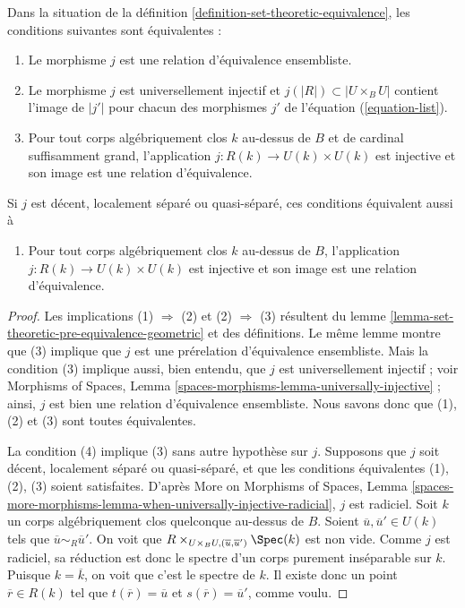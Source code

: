 \begin{lemma}
\label{lemma-set-theoretic-equivalence-geometric}
Dans la situation de la définition \ref{definition-set-theoretic-equivalence},
les conditions suivantes sont équivalentes :
\begin{enumerate}
\item Le morphisme $j$ est une relation d'équivalence ensembliste.
\item Le morphisme $j$ est universellement injectif et
$j(|R|) \subset |U \times_B U|$ contient l'image de
$|j'|$ pour chacun des morphismes $j'$ de l'équation (\ref{equation-list}).
\item Pour tout corps algébriquement clos $k$ au-dessus de $B$ et de cardinal suffisamment grand,
l'application $j : R(k) \to U(k) \times U(k)$ est injective et
son image est une relation d'équivalence.
\end{enumerate}
Si $j$ est décent, localement séparé ou quasi-séparé,
ces conditions équivalent aussi à
\begin{enumerate}
\item[(4)] Pour tout corps algébriquement clos $k$ au-dessus de $B$,
l'application $j : R(k) \to U(k) \times U(k)$ est injective et son image
est une relation d'équivalence.
\end{enumerate}
\end{lemma}

\begin{proof}
Les implications (1) $\Rightarrow$ (2) et (2) $\Rightarrow$ (3) résultent du
lemme \ref{lemma-set-theoretic-pre-equivalence-geometric}
et des définitions. Le même lemme montre que (3) implique que
$j$ est une prérelation d'équivalence ensembliste. Mais la condition
(3) implique aussi, bien entendu, que $j$ est universellement injectif ; voir
Morphisms of Spaces, Lemma \ref{spaces-morphisms-lemma-universally-injective} ;
ainsi, $j$ est bien une relation d'équivalence ensembliste.
Nous savons donc que (1), (2) et (3) sont toutes équivalentes.

\medskip\noindent
La condition (4) implique (3) sans autre hypothèse sur $j$. Supposons que $j$
soit décent, localement séparé ou quasi-séparé, et que les conditions équivalentes
(1), (2), (3) soient satisfaites. D'après
More on Morphisms of Spaces,
Lemma \ref{spaces-more-morphisms-lemma-when-universally-injective-radicial},
$j$ est radiciel.
Soit $k$ un corps algébriquement clos quelconque au-dessus de $B$. Soient
$\overline{u}, \overline{u}' \in U(k)$ tels que
$\overline{u} \sim_R \overline{u}'$. On voit que
$R \times_{U \times_B U, (\overline{u}, \overline{u}')} \Spec(k)$
est non vide. Comme $j$ est radiciel, sa réduction est donc le spectre d'un
corps purement inséparable sur $k$. Puisque $k = \overline{k}$, on voit que
c'est le spectre de $k$. Il existe donc un point $\overline{r} \in R(k)$
tel que $t(\overline{r}) = \overline{u}$ et $s(\overline{r}) = \overline{u}'$,
comme voulu.
\end{proof}


